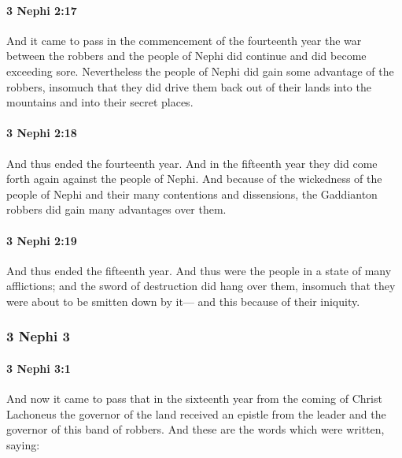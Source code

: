 		\paragraph{3 Nephi 2:17} %
			\label{3NEPHI-2-17}

			And it came to pass in the commencement of the fourteenth year
			the war between the robbers and the people of Nephi did continue
			and did become exceeding sore.
			Nevertheless the people of Nephi did gain some advantage of the robbers,
			insomuch that they did drive them back out of their lands
			into the mountains and into their secret places.

		\paragraph{3 Nephi 2:18} %
			\label{3NEPHI-2-18}

			And thus ended the fourteenth year.
			And in the fifteenth year they did come forth again against the people of Nephi.
			And because of the wickedness of the people of Nephi
			and their many contentions and dissensions,
			the Gaddianton robbers did gain many advantages over them.

		\paragraph{3 Nephi 2:19} %
			\label{3NEPHI-2-19}

			And thus ended the fifteenth year.
			And thus were the people in a state of many afflictions;
			and the sword of destruction did hang over them,
			insomuch that they were about to be smitten down by it---
			and this because of their iniquity.

	\subsubsection{3 Nephi 3} %
		\label{3NEPHI-3}
		
		\paragraph{3 Nephi 3:1} %
			\label{3NEPHI-3-1}

			And now it came to pass that
			in the sixteenth year from the coming of Christ
			Lachoneus the governor of the land received an epistle
			from the leader and the governor of this band of robbers.
			And these are the words which were written, saying:

